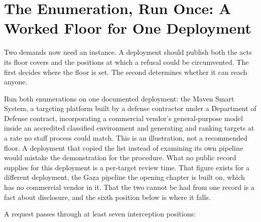 \section{The Enumeration, Run Once: A Worked Floor for One Deployment}
\label{sec:enumeration-deployment}
Two demands now need an instance. A deployment should publish both the acts its floor covers and the positions at which a refusal could be circumvented. The first decides where the floor is set. The second determines whether it can reach anyone.

Run both enumerations on one documented deployment: the Maven Smart System, a targeting platform built by a defense contractor under a Department of Defense contract, incorporating a commercial vendor's general-purpose model inside an accredited classified environment and generating and ranking targets at a rate no staff process could match. This is an illustration, not a recommended floor. A deployment that copied the list instead of examining its own pipeline would mistake the demonstration for the procedure. What no public record supplies for this deployment is a per-target review time. That figure exists for a different deployment, the Gaza pipeline the opening chapter is built on, which has no commercial vendor in it. That the two cannot be had from one record is a fact about disclosure, and the sixth position below is where it falls.


A request passes through at least seven interception positions:

